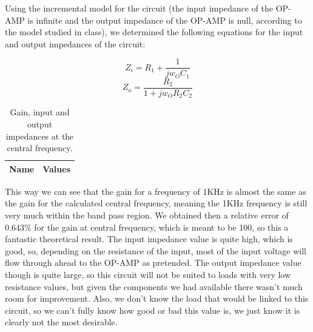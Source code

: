 Using the incremental model for the circuit (the input impedance of the OP-AMP is infinite and the output impedance of the OP-AMP is null, according to the model studied in class), we determined the following equations for the input and output impedances of the circuit:

\begin{equation}
Z_i = R_1 + \frac{1}{jw_{O}C_{1}}
\end{equation}
\begin{equation}
Z_o = \frac{R_2}{1+jw_OR_2C_2}
\end{equation}

\begin{table}[h!]
  \centering
  \begin{tabular}{|l|r|}
    \hline    
    {\bf Name} & {\bf Values} \\ \hline
     
  \end{tabular}
  \caption{Gain, input and output impedances at the central frequency.}
  \label{tab:data}
\end{table}

This way we can see that the gain for a frequency of 1KHz is almost the same as the gain for the calculated central frequency, meaning the 1KHz frequency is still very much within the band pass region.
We obtained then a relative error of 0.643\% for the gain at central frequency, which is meant to be 100, so this a 
fantastic theoretical result. The input impedance value is quite high, which is good, so, depending on the resistance of the input, most of the input 
voltage will flow through ahead to the OP-AMP as pretended. The output impedance value though is quite large, so this circuit will not be suited to loads with very low resistance values, but given 
the components we had available there wasn't much room for improvement. Also, we don't know the load that would be linked to this circuit, so we can't fully know how good or bad this value is, 
we just know it is clearly not the most desirable.